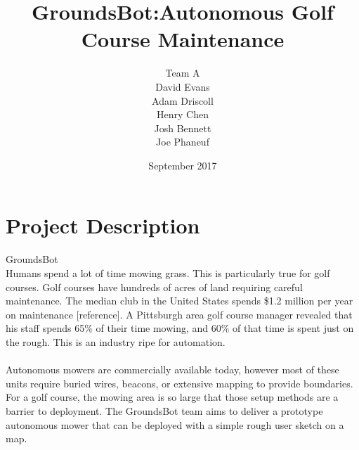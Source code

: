 \documentclass{article}
\begin{document}


\title{GroundsBot:Autonomous Golf Course Maintenance}
\date{September 2017}
\author{Team A        \\ David Evans \\
        Adam Driscoll \\ Henry Chen  \\
        Josh Bennett  \\ Joe Phaneuf \\ }
\maketitle
\newpage

\tableofcontents
\newpage

\section{Project Description}

GroundsBot \\

Humans spend a lot of time mowing grass. This is particularly true for golf courses. Golf courses have hundreds of acres of land requiring careful maintenance.  The median club in the United States spends \$1.2 million per year on maintenance [reference]. A Pittsburgh area golf course manager revealed that his staff spends 65\% of their time mowing, and 60\% of that time is spent just on the rough. This is an industry ripe for automation.
\\
\\
Autonomous mowers are commercially available today, however most of these units require buried wires, beacons, or extensive mapping to provide boundaries. For a golf course, the mowing area is so large that those setup methods are a barrier to deployment. The GroundsBot team aims to deliver a prototype autonomous mower that can be deployed with a simple rough user sketch on a map.
\end{document}
